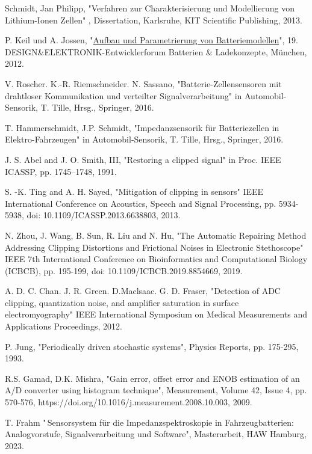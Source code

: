 \begin{thebibliography}{[99]}

	Schmidt, Jan Philipp, "Verfahren zur Charakterisierung und Modellierung von Lithium-Ionen Zellen" , Dissertation, Karlsruhe, KIT Scientific Publishing, 2013.
	
	P. Keil und A. Jossen, "\href{https://mediatum.ub.tum.de/doc/1162416/1162416.pdf}{Aufbau und Parametrierung von Batteriemodellen}", 19. DESIGN\&ELEKTRONIK-Entwicklerforum Batterien \& Ladekonzepte, München, 2012.
	
	V. Roscher. K.-R. Riemschneider. N. Sassano, "Batterie-Zellensensoren mit drahtloser Kommunikation und verteilter Signalverarbeitung" in Automobil-Sensorik, T. Tille, Hrsg., Springer, 2016.
	
	T. Hammerschmidt, J.P. Schmidt, "Impedanzsensorik für Batteriezellen in Elektro-Fahrzeugen" in Automobil-Sensorik, T. Tille, Hrsg., Springer, 2016.
	
		
	J. S. Abel and J. O. Smith, III, "Restoring a clipped signal" in
	Proc. IEEE ICASSP, pp. 1745–1748, 1991. 
	
	S. -K. Ting and A. H. Sayed, "Mitigation of clipping in sensors" IEEE International Conference on Acoustics, Speech and Signal Processing, pp. 5934-5938, doi: 10.1109/ICASSP.2013.6638803, 2013.
	
	N. Zhou, J. Wang, B. Sun, R. Liu and N. Hu, "The Automatic Repairing Method Addressing Clipping Distortions and Frictional Noises in Electronic Stethoscope" IEEE 7th International Conference on Bioinformatics and Computational Biology (ICBCB), pp. 195-199, doi: 10.1109/ICBCB.2019.8854669, 2019.
	
	A. D. C. Chan. J. R. Green. D.Maclsaac. G. D. Fraser, "Detection of ADC clipping, quantization noise, and amplifier saturation in surface electromyography" IEEE International Symposium on Medical Measurements and Applications Proceedings, 2012.
	
	P. Jung, "Periodically driven stochastic systems", Physics Reports,  pp. 175-295, 1993.

	R.S. Gamad, D.K. Mishra,
	"Gain error, offset error and ENOB estimation of an A/D converter using histogram technique",
	Measurement, Volume 42, Issue 4, pp. 570-576, https://doi.org/10.1016/j.measurement.2008.10.003, 2009.

	T. Frahm "\,Sensorsystem für die Impedanzspektroskopie in Fahrzeugbatterien: Analogvorstufe, Signalverarbeitung und Software", Masterarbeit, HAW Hamburg, 2023.


	
\end{thebibliography}
	

 
 
